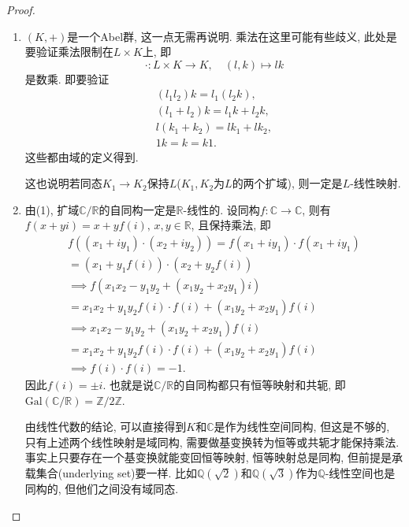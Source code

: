 \documentclass{../solutions-cn}
\begin{document}
\begin{proof}
    \begin{enumerate}[(1)]
        \item $(K, +)$是一个Abel群, 这一点无需再说明. 乘法在这里可能有些歧义, 此处是要验证乘法限制在$L \times K$上, 即
        \[
            \cdot: L \times K \to K, \quad (l, k) \mapsto lk
        \]
        是数乘. 即要验证
        \[
        \begin{gathered}
            (l_1l_2)k = l_1(l_2k),\\
            (l_1 + l_2)k = l_1k + l_2k,\\
            l(k_1 + k_2) = lk_1 + lk_2,\\
            1k = k = k1.
        \end{gathered}
        \]
        这些都由域的定义得到.
        
        这也说明若同态$K_1 \to K_2$保持$L$($K_1, K_2$为$L$的两个扩域), 则一定是$L$-线性映射.
        \item 由(1), 扩域$\mathbb{C}/\mathbb{R}$的自同构一定是$\mathbb{R}$-线性的. 设同构$f: \mathbb{C} \to \mathbb{C}$, 则有$f(x + yi) = x + yf(i),\, x, y \in \mathbb{R}$, 且保持乘法, 即
        \[
        \begin{gathered}
            f\left((x_1 + iy_1) \cdot (x_2 + iy_2)\right) = f(x_1 + iy_1) \cdot f(x_1 + iy_1)\\
            = (x_1 + y_1f(i)) \cdot (x_2 + y_2f(i))\\
            \implies f\left(x_1x_2 - y_1y_2 + (x_1y_2 +x_2y_1)i\right) \\= x_1x_2 + y_1y_2f(i) \cdot f(i) + (x_1y_2 +x_2y_1)f(i)\\
            \implies x_1x_2 - y_1y_2 + (x_1y_2 +x_2y_1)f(i)\\
            = x_1x_2 + y_1y_2f(i) \cdot f(i) + (x_1y_2 +x_2y_1)f(i)\\
            \implies f(i) \cdot f(i) = -1.
        \end{gathered}
        \]
        因此$f(i) = \pm i$. 也就是说$\mathbb{C}/\mathbb{R}$的自同构都只有恒等映射和共轭, 即$\mathrm{Gal}(\mathbb{C}/\mathbb{R}) = \mathbb{Z}/2\mathbb{Z}$.
        
        由线性代数的结论, 可以直接得到$K$和$\mathbb{C}$是作为线性空间同构, 但这是不够的, 只有上述两个线性映射是域同构, 需要做基变换转为恒等或共轭才能保持乘法. 事实上只要存在一个基变换就能变回恒等映射, 恒等映射总是同构, 但前提是承载集合(underlying set)要一样. 比如$\mathbb{Q}(\sqrt{2})$和$\mathbb{Q}(\sqrt{3})$作为$\mathbb{Q}$-线性空间也是同构的, 但他们之间没有域同态.
        

\end{enumerate}
\end{proof}
\end{document}
